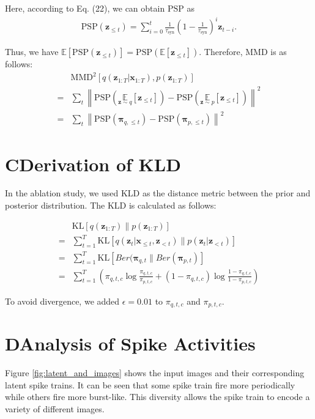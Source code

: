 \documentclass[letterpaper]{article} %
\begin{document}
Here, according to Eq. (22), we can obtain $\mathrm{PSP}$ as 
\begin{align*}
    \mathrm{PSP}(\bm{z}_{\leq t}) = \sum_{i=0}^t \frac{1}{\tau_{\mathrm{syn}}}\left(1-\frac{1}{\tau_{\mathrm{syn}}} \right)^i \bm{z}_{t-i}.
\end{align*}

Thus, we have $\mathbb{E}[\mathrm{PSP}(\bm{z}_{\leq t})] = \mathrm{PSP}(\mathbb{E}[\bm{z}_{\leq t}])$. Therefore, MMD is as follows:
\begin{align*}
&\mathrm{MMD}^2[q(\bm{z}_{1:T}|\bm{x}_{1:T}),p(\bm{z}_{1:T})]\nonumber\\
    =& \sum_{t} \left\| \mathrm{PSP}(\underset{\bm{z}\sim q}{\mathbb{E}}[\bm{z}_{\leq t}]) - \mathrm{PSP}(\underset{\bm{z}\sim p}{\mathbb{E}}[\bm{z}_{\leq t}]) \right\|^2 \nonumber\\
    =& \sum_{t} \left\| \mathrm{PSP}(\bm{\pi}_{q,\leq t}) - \mathrm{PSP}(\bm{\pi}_{p,\leq t})\right\|^2\nonumber
\end{align*}

\section{C\quad Derivation of KLD}

In the ablation study, we used KLD as the distance metric between the prior and posterior distribution. The KLD is calculated as follows:

\begin{align*}
    &\mathrm{KL} [q(\bm{z}_{1:T})\| p(\bm{z}_{1:T})] \\
    =& \sum_{t=1}^T \mathrm{KL} [ q(\bm{z}_t | \bm{x}_{\leq t}, \bm{z}_{<t}) \| p(\bm{z}_t | \bm{z}_{<t})]\\
    =& \sum_{t=1}^T \mathrm{KL} [Ber(\bm{\pi}_{q,t} \| Ber(\bm{\pi}_{p,t})] \\
    =& \sum_{t=1}^T \left(\pi_{q,t,c} \log \frac{\pi_{q,t,c}}{\pi_{p,t,c}} + (1-\pi_{q,t,c}) \log \frac{1-\pi_{q,t,c}}{1-\pi_{p,t,c}}\right)
\end{align*}

To avoid divergence, we added $\epsilon = 0.01$ to $\pi_{q,t,c}$ and $\pi_{p,t,c}$.
\section{D\quad Analysis of Spike Activities}
Figure \ref{fig:latent_and_images} shows the input images and their corresponding latent spike trains. It can be seen that some spike train fire more periodically while others fire more burst-like. This diversity allows the spike train to encode a variety of different images.
\end{document}
